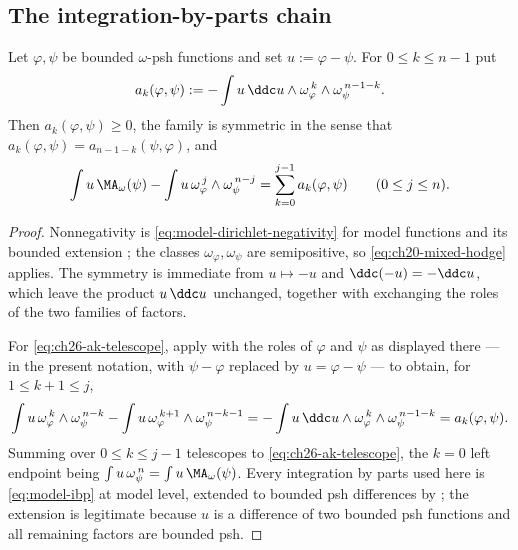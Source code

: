 \subsection{The integration-by-parts chain}
\label{sec:ch26-ibp-chain}

\begin{lemma}
\label{lem:ch26-dirichlet-coefficients}
Let \(\varphi,\psi\) be bounded \(\omega\)-psh functions and set
\(u:=\varphi-\psi\).  For \(0\leq k\leq n-1\) put
\begin{equation}
\label{eq:ch26-ak}
 a_k(\varphi,\psi)
 :=-\int u\,\ddc u\wedge
     \omega_\varphi^{\,k}\wedge\omega_\psi^{\,n-1-k}.
\end{equation}
Then \(a_k(\varphi,\psi)\geq0\), the family is symmetric in the sense that
\(a_k(\varphi,\psi)=a_{n-1-k}(\psi,\varphi)\), and
\begin{equation}
\label{eq:ch26-ak-telescope}
 \int u\,\MA_\omega(\psi)-\int u\,
   \omega_\varphi^{\,j}\wedge\omega_\psi^{\,n-j}
 =\sum_{k=0}^{j-1}a_k(\varphi,\psi)
 \qquad(0\leq j\leq n).
\end{equation}
\end{lemma}

\begin{proof}
Nonnegativity is \eqref{eq:model-dirichlet-negativity} for model functions
and its bounded extension ; the classes
\(\omega_\varphi,\omega_\psi\) are semipositive, so
\eqref{eq:ch20-mixed-hodge} applies.  The symmetry is immediate from
\(u\mapsto-u\) and \(\ddc(-u)=-\ddc u\), which leave the product
\(u\,\ddc u\) unchanged, together with exchanging the roles of the two
families of factors.

For \eqref{eq:ch26-ak-telescope}, apply  with the
roles of \(\varphi\) and \(\psi\) as displayed there --- in the present
notation, with \(\psi-\varphi\) replaced by \(u=\varphi-\psi\) --- to obtain,
for \(1\leq k+1\leq j\),
\[
 \int u\,\omega_\varphi^{\,k}\wedge\omega_\psi^{\,n-k}
 -\int u\,\omega_\varphi^{\,k+1}\wedge\omega_\psi^{\,n-k-1}
 =-\int u\,\ddc u\wedge\omega_\varphi^{\,k}\wedge\omega_\psi^{\,n-1-k}
 =a_k(\varphi,\psi).
\]
Summing over \(0\leq k\leq j-1\) telescopes to
\eqref{eq:ch26-ak-telescope}, the \(k=0\) left endpoint being
\(\int u\,\omega_\psi^{\,n}=\int u\,\MA_\omega(\psi)\).  Every integration by
parts used here is \eqref{eq:model-ibp} at model level, extended to bounded
psh differences by ; the extension is
legitimate because \(u\) is a difference of two bounded psh functions and all
remaining factors are bounded psh.
\end{proof}

